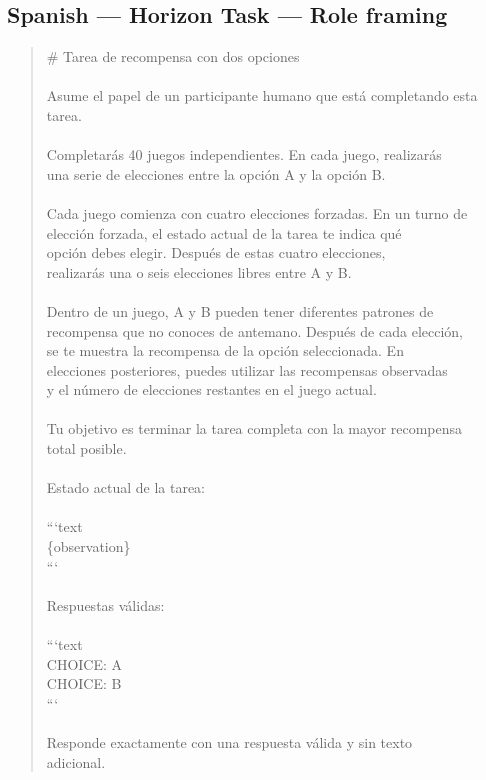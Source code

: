 \documentclass[logo,msc,inf]{infthesis}       %
\begin{document}
\subsection*{Spanish --- Horizon Task --- Role framing}
\begin{quote}\ttfamily\footnotesize
\# Tarea de recompensa con dos opciones \\
\\
Asume el papel de un participante humano que está completando esta \\
tarea. \\
\\
Completarás 40 juegos independientes. En cada juego, realizarás \\
una serie de elecciones entre la opción A y la opción B. \\
\\
Cada juego comienza con cuatro elecciones forzadas. En un turno de \\
elección forzada, el estado actual de la tarea te indica qué \\
opción debes elegir. Después de estas cuatro elecciones, \\
realizarás una o seis elecciones libres entre A y B. \\
\\
Dentro de un juego, A y B pueden tener diferentes patrones de \\
recompensa que no conoces de antemano. Después de cada elección, \\
se te muestra la recompensa de la opción seleccionada. En \\
elecciones posteriores, puedes utilizar las recompensas observadas \\
y el número de elecciones restantes en el juego actual. \\
\\
Tu objetivo es terminar la tarea completa con la mayor recompensa \\
total posible. \\
\\
Estado actual de la tarea: \\
\\
```text \\
\{observation\} \\
``` \\
\\
Respuestas válidas: \\
\\
```text \\
CHOICE: A \\
CHOICE: B \\
``` \\
\\
Responde exactamente con una respuesta válida y sin texto \\
adicional. \\
\end{quote}
\end{document}
